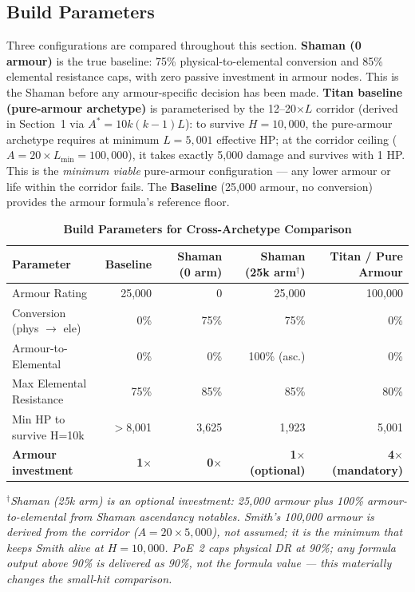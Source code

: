 \documentclass[12pt, letterpaper]{article}
\begin{document}
\subsection*{Build Parameters}

Three configurations are compared throughout this section. \textbf{Shaman (0 armour)} is the true baseline: 75\% physical-to-elemental conversion and 85\% elemental resistance caps, with zero passive investment in armour nodes. This is the Shaman before any armour-specific decision has been made. \textbf{Titan baseline (pure-armour archetype)} is parameterised by the 12--20$\times L$ corridor (derived in Section~1 via $A^* = 10k(k-1)L$): to survive $H = 10{,}000$, the pure-armour archetype requires at minimum $L = 5{,}001$ effective HP; at the corridor ceiling ($A = 20 \times L_{\min} = 100{,}000$), it takes exactly 5{,}000 damage and survives with 1 HP. This is the \textit{minimum viable} pure-armour configuration --- any lower armour or life within the corridor fails. The \textbf{Baseline} (25{,}000 armour, no conversion) provides the armour formula's reference floor.

\begin{table}[htbp]
\centering
\caption{\textbf{Build Parameters for Cross-Archetype Comparison}}
\begin{tabular}{lrrrr}
\toprule
\textbf{Parameter} & \textbf{Baseline} & \textbf{Shaman (0 arm)} & \textbf{Shaman (25k arm$^\dagger$)} & \textbf{Titan / Pure Armour} \\
\midrule
\rowcolor{rowalt} Armour Rating & 25{,}000 & 0 & 25{,}000 & 100{,}000 \\
Conversion (phys $\to$ ele) & 0\% & 75\% & 75\% & 0\% \\
\rowcolor{rowalt} Armour-to-Elemental & 0\% & 0\% & 100\% (asc.) & 0\% \\
Max Elemental Resistance & 75\% & 85\% & 85\% & 80\% \\
\rowcolor{rowalt} Min HP to survive H=10k & $>$8{,}001 & 3{,}625 & 1{,}923 & 5{,}001 \\
\rowcolor{rowhi} \textbf{Armour investment} & \textbf{1$\times$} & \textbf{0$\times$} & \textbf{1$\times$ (optional)} & \textbf{4$\times$ (mandatory)} \\
\bottomrule
\end{tabular}
\smallskip
\begin{minipage}{\linewidth}
\small\textit{$^\dagger$Shaman (25k arm) is an optional investment: 25{,}000 armour plus 100\% armour-to-elemental from Shaman ascendancy notables. Smith's 100{,}000 armour is derived from the corridor ($A = 20 \times 5{,}000$), not assumed; it is the minimum that keeps Smith alive at $H = 10{,}000$. PoE~2 caps physical DR at 90\%; any formula output above 90\% is delivered as 90\%, not the formula value --- this materially changes the small-hit comparison.}
\end{minipage}
\end{table}
\end{document}
